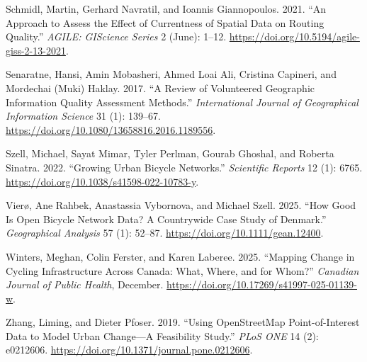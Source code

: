 \documentclass[
]{article}
\newlength{\cslhangindent}
\newenvironment{CSLReferences}[2] %
 {\begin{list}{}{%
  \setlength{\itemindent}{0pt}
  \setlength{\leftmargin}{0pt}
  \setlength{\parsep}{0pt}
  \ifodd #1
   \setlength{\leftmargin}{\cslhangindent}
   \setlength{\itemindent}{-1\cslhangindent}
  \fi
  \setlength{\itemsep}{#2\baselineskip}}}
 {\end{list}}
\begin{document}
\begin{CSLReferences}{1}{0}
Schmidl, Martin, Gerhard Navratil, and Ioannis Giannopoulos. 2021. {``An
{Approach} to {Assess} the {Effect} of {Currentness} of {Spatial} {Data}
on {Routing} {Quality}.''} \emph{AGILE: GIScience Series} 2 (June):
1--12. \url{https://doi.org/10.5194/agile-giss-2-13-2021}.

Senaratne, Hansi, Amin Mobasheri, Ahmed Loai Ali, Cristina Capineri, and
Mordechai (Muki) Haklay. 2017. {``A Review of Volunteered Geographic
Information Quality Assessment Methods.''} \emph{International Journal
of Geographical Information Science} 31 (1): 139--67.
\url{https://doi.org/10.1080/13658816.2016.1189556}.

Szell, Michael, Sayat Mimar, Tyler Perlman, Gourab Ghoshal, and Roberta
Sinatra. 2022. {``Growing Urban Bicycle Networks.''} \emph{Scientific
Reports} 12 (1): 6765. \url{https://doi.org/10.1038/s41598-022-10783-y}.

Vierø, Ane Rahbek, Anastassia Vybornova, and Michael Szell. 2025. {``How
{Good} {Is} {Open} {Bicycle} {Network} {Data}? {A} {Countrywide} {Case}
{Study} of {Denmark}.''} \emph{Geographical Analysis} 57 (1): 52--87.
\url{https://doi.org/10.1111/gean.12400}.

Winters, Meghan, Colin Ferster, and Karen Laberee. 2025. {``Mapping
Change in Cycling Infrastructure Across {Canada}: {What}, Where, and for
Whom?''} \emph{Canadian Journal of Public Health}, December.
\url{https://doi.org/10.17269/s41997-025-01139-w}.

Zhang, Liming, and Dieter Pfoser. 2019. {``Using {OpenStreetMap}
Point-of-Interest Data to Model Urban Change---{A} Feasibility Study.''}
\emph{PLoS ONE} 14 (2): e0212606.
\url{https://doi.org/10.1371/journal.pone.0212606}.

\end{CSLReferences}
\end{document}
